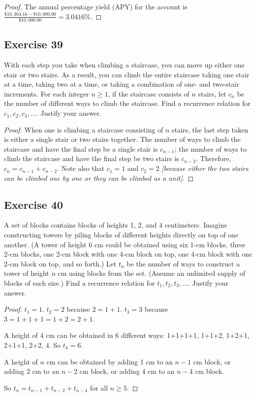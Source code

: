 \documentclass[14pt]{extarticle}
\newcommand{\dps}{\displaystyle}
\begin{document}
    \begin{proof}
        The annual percentage yield (APY) for the account is \(\dps \frac{\$10,304.16 - \$10,000.00}{\$10,000.00} = 3.0416\%\).
    \end{proof}

    \subsection{Exercise 39}
    With each step you take when climbing a staircase, you can move up either one stair or two stairs. As a result, you
    can climb the entire staircase taking one stair at a time, taking two at a time, or taking a combination of one- and
    two-stair increments. For each integer $n \geq 1$, if the staircase consists of $n$ stairs, let $c_n$ be the number
    of different ways to climb the staircase. Find a recurrence relation for $c_1, c_2, c_3, \ldots$. Justify your answer.

    \begin{proof}
        When one is climbing a staircase consisting of $n$ stairs, the last step taken is either a single stair or two stairs
        together. The number of ways to climb the staircase and have the final step be a single stair is $c_{n-1}$; the
        number of ways to climb the staircase and have the final step be two stairs is $c_{n-2}$. Therefore, \(c_n = c_{n-1}
        + c_{n-2}\). Note also that $c_1 = 1$ and $c_2 = 2$ {\it [because either the two stairs can be climbed one by one or
                    they can be climbed as a unit]}.
    \end{proof}

    \subsection{Exercise 40}
    A set of blocks contains blocks of heights 1, 2, and 4 centimeters. Imagine constructing towers by piling blocks
    of different heights directly on top of one another. (A tower of height 6 cm could be obtained using six 1-cm
    blocks, three 2-cm blocks, one 2-cm block with one 4-cm block on top, one 4-cm block with one 2-cm block on top,
    and so forth.) Let $t_n$ be the number of ways to construct a tower of height $n$ cm using blocks from the set. (Assume
    an unlimited supply of blocks of each size.) Find a recurrence relation for $t_1, t_2, t_3, \ldots$. Justify your answer.

    \begin{proof}
        $t_1 = 1$. $t_2 = 2$ because $2 = 1+1$. $t_3 = 3$ because $3 = 1 + 1 + 1 = 1 + 2 = 2 + 1$.

        A height of 4 cm can be obtained in 6 different ways: 1+1+1+1, 1+1+2, 1+2+1, 2+1+1, 2+2, 4. So $t_4 = 6$.

        A height of $n$ cm can be obtained by adding 1 cm to an $n-1$ cm block, or adding 2 cm to an $n-2$ cm block, or
        adding 4 cm to an $n-4$ cm block.

        So \(t_{n} = t_{n-1} + t_{n-2} + t_{n-4}\) for all \(n \geq 5\).
    \end{proof}
\end{document}
